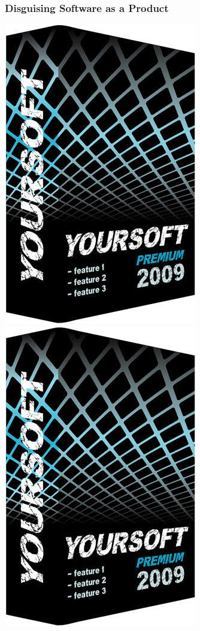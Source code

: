 \documentclass[18pt]{beamer}
\begin{document}
{
\begin{frame}
\frametitle{Disguising Software as a Product}
\begin{center}
  \includegraphics[width=0.4\paperwidth,height=0.8\paperheight]{../Art/4047547668_f46315f196_smaller.jpg}
  \includegraphics[width=0.4\paperwidth,height=0.8\paperheight]{../Art/4047547668_f46315f196_smaller.jpg}
\end{center}
\end{frame}
}
\end{document}
